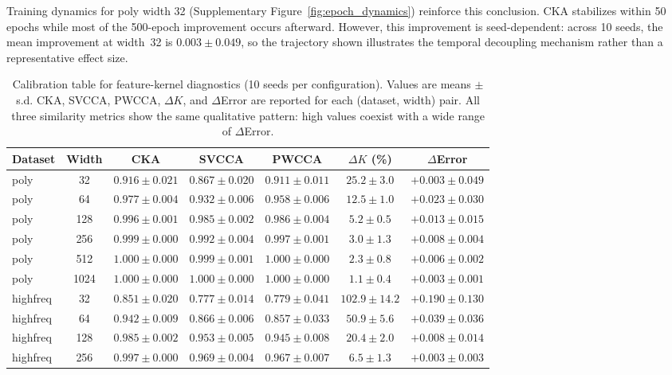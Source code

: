 \documentclass[twoside,11pt]{article}
\begin{document}
Training dynamics for poly width 32 (Supplementary Figure~\ref{fig:epoch_dynamics}) reinforce this conclusion. CKA stabilizes within 50 epochs while most of the 500-epoch improvement occurs afterward. However, this improvement is seed-dependent: across 10 seeds, the mean improvement at width~32 is $0.003\pm0.049$, so the trajectory shown illustrates the temporal decoupling mechanism rather than a representative effect size.

\begin{table}[t]
    \centering\footnotesize
        \caption{Calibration table for feature-kernel diagnostics (10 seeds per configuration).  Values are means $\pm$ s.d.  CKA, SVCCA, PWCCA, $\Delta K$, and $\Delta$Error are reported for each (dataset, width) pair.  All three similarity metrics show the same qualitative pattern: high values coexist with a wide range of $\Delta$Error.}
    \label{tab:results}
    \begin{tabular}{lcccccc}
    \toprule
    Dataset & Width & CKA & SVCCA & PWCCA & $\Delta K$ (\%) & $\Delta$Error \\
    \midrule
    poly & 32   & $0.916\pm0.021$ & $0.867\pm0.020$ & $0.911\pm0.011$ & $25.2\pm3.0$ & $+0.003\pm0.049$ \\
    poly & 64   & $0.977\pm0.004$ & $0.932\pm0.006$ & $0.958\pm0.006$ & $12.5\pm1.0$ & $+0.023\pm0.030$ \\
    poly & 128  & $0.996\pm0.001$ & $0.985\pm0.002$ & $0.986\pm0.004$ & $5.2\pm0.5$  & $+0.013\pm0.015$ \\
    poly & 256  & $0.999\pm0.000$ & $0.992\pm0.004$ & $0.997\pm0.001$ & $3.0\pm1.3$  & $+0.008\pm0.004$ \\
    poly & 512  & $1.000\pm0.000$ & $0.999\pm0.001$ & $1.000\pm0.000$ & $2.3\pm0.8$  & $+0.006\pm0.002$ \\
    poly & 1024 & $1.000\pm0.000$ & $1.000\pm0.000$ & $1.000\pm0.000$ & $1.1\pm0.4$  & $+0.003\pm0.001$ \\
    \midrule
    highfreq & 32  & $0.851\pm0.020$ & $0.777\pm0.014$ & $0.779\pm0.041$ & $102.9\pm14.2$ & $+0.190\pm0.130$ \\
    highfreq & 64  & $0.942\pm0.009$ & $0.866\pm0.006$ & $0.857\pm0.033$ & $50.9\pm5.6$   & $+0.039\pm0.036$ \\
    highfreq & 128 & $0.985\pm0.002$ & $0.953\pm0.005$ & $0.945\pm0.008$ & $20.4\pm2.0$   & $+0.008\pm0.014$ \\
    highfreq & 256 & $0.997\pm0.000$ & $0.969\pm0.004$ & $0.967\pm0.007$ & $6.5\pm1.3$    & $+0.003\pm0.003$ \\

\end{tabular}
\end{table}
\end{document}
